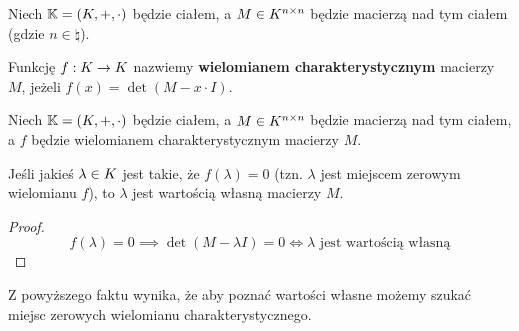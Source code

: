 \begin{definition}
	Niech \(\mathbb{K} = (K, +, \cdot)\) będzie ciałem, a \(M \in K^{n \times n}\) będzie macierzą nad tym ciałem (gdzie \(n \in \natural\)).

	Funkcję \(f: K \rightarrow K\) nazwiemy \textbf{wielomianem charakterystycznym} macierzy \(M\), jeżeli \(f(x) = \det{(M - x \cdot I)}\).
\end{definition}

\begin{fact}
	Niech \(\mathbb{K} = (K, +, \cdot)\) będzie ciałem, a \(M \in K^{n \times n}\) będzie macierzą nad tym ciałem, a \(f\) będzie wielomianem charakterystycznym macierzy \(M\).

	Jeśli jakieś \(\lambda \in K\) jest takie, że \(f(\lambda)=0\) (tzn. \(\lambda\) jest miejscem zerowym wielomianu \(f\)), to \(\lambda\) jest wartością własną macierzy \(M\).
\end{fact}
\begin{proof}
	\[
		f(\lambda) = 0 \implies \det{(M - \lambda I)} = 0 \iff \text{\(\lambda\) jest wartością własną}
	\]
\end{proof}

Z powyższego faktu wynika, że aby poznać wartości własne możemy szukać miejsc zerowych wielomianu charakterystycznego.